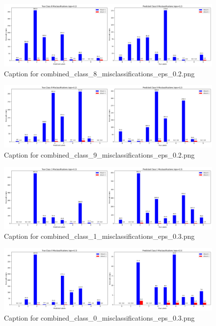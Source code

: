 \documentclass[11pt,onside]{article}
\begin{document}
\begin{figure}[ht]
\centering
\includegraphics[width=1\textwidth]{combined_class_boundary_pgd/combined_class_8_misclassifications_eps_0.2.png}
\caption{Caption for combined_class_8_misclassifications_eps_0.2.png}
\label{fig:combined_class_8_misclassifications_eps_0.2.png}
\end{figure}

\begin{figure}[ht]
\centering
\includegraphics[width=1\textwidth]{combined_class_boundary_pgd/combined_class_9_misclassifications_eps_0.2.png}
\caption{Caption for combined_class_9_misclassifications_eps_0.2.png}
\label{fig:combined_class_9_misclassifications_eps_0.2.png}
\end{figure}

\begin{figure}[ht]
\centering
\includegraphics[width=1\textwidth]{combined_class_boundary_pgd/combined_class_1_misclassifications_eps_0.3.png}
\caption{Caption for combined_class_1_misclassifications_eps_0.3.png}
\label{fig:combined_class_1_misclassifications_eps_0.3.png}
\end{figure}

\begin{figure}[ht]
\centering
\includegraphics[width=1\textwidth]{combined_class_boundary_pgd/combined_class_0_misclassifications_eps_0.3.png}
\caption{Caption for combined_class_0_misclassifications_eps_0.3.png}
\label{fig:combined_class_0_misclassifications_eps_0.3.png}
\end{figure}
\end{document}
